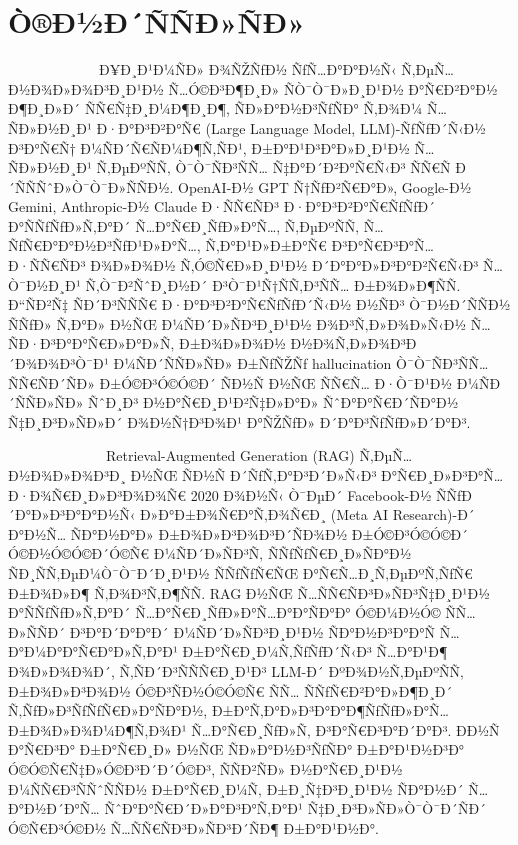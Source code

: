 \documentclass[12pt,A4]{report}
\begin{document}
\chapter{Ò®Ð½Ð´ÑÑÐ»ÑÐ»}
\ \ \ \ \ \ \ \ \  \ \ \ \ Ð¥Ð¸Ð¹Ð¼ÑÐ» Ð¾ÑŽÑƒÐ½ ÑƒÑ…Ð°Ð°Ð½Ñ‹ Ñ‚ÐµÑ…Ð½Ð¾Ð»Ð¾Ð³Ð¸Ð¹Ð½ Ñ…Ó©Ð³Ð¶Ð¸Ð» ÑÒ¯Ò¯Ð»Ð¸Ð¹Ð½
Ð°Ñ€Ð²Ð°Ð½ Ð¶Ð¸Ð»Ð´ ÑÑ€Ñ‡Ð¸Ð¼Ð¶Ð¸Ð¶, ÑÐ»Ð°Ð½Ð³ÑƒÑÐ° Ñ‚Ð¾Ð¼ Ñ…ÑÐ»Ð½Ð¸Ð¹ Ð·Ð°Ð³Ð²Ð°Ñ€ (Large Language Model,
LLM)-ÑƒÑƒÐ´Ñ‹Ð½ Ð³Ð°Ñ€Ñ† Ð¼ÑÐ´Ñ€ÑÐ¼Ð¶Ñ‚ÑÐ¹, Ð±Ð°Ð¹Ð³Ð°Ð»Ð¸Ð¹Ð½ Ñ…ÑÐ»Ð½Ð¸Ð¹ Ñ‚ÐµÐºÑÑ‚ Ò¯Ò¯ÑÐ³ÑÑ… Ñ‡Ð°Ð´Ð²Ð°Ñ€Ñ‹Ð³ ÑÑ€Ñ
Ð´ÑÑÑˆÐ»Ò¯Ò¯Ð»ÑÑÐ½. OpenAI-Ð½ GPT Ñ†ÑƒÐ²Ñ€Ð°Ð», Google-Ð½ Gemini, Anthropic-Ð½ Claude Ð·ÑÑ€ÑÐ³
Ð·Ð°Ð³Ð²Ð°Ñ€ÑƒÑƒÐ´ Ð°ÑÑƒÑƒÐ»Ñ‚Ð°Ð´ Ñ…Ð°Ñ€Ð¸ÑƒÐ»Ð°Ñ…, Ñ‚ÐµÐºÑÑ‚ Ñ…ÑƒÑ€Ð°Ð°Ð½Ð³ÑƒÐ¹Ð»Ð°Ñ…, Ñ‚Ð°Ð¹Ð»Ð±Ð°Ñ€ Ð³Ð°Ñ€Ð³Ð°Ñ… Ð·ÑÑ€ÑÐ³
Ð¾Ð»Ð¾Ð½ Ñ‚Ó©Ñ€Ð»Ð¸Ð¹Ð½ Ð´Ð°Ð°Ð»Ð³Ð°Ð²Ñ€Ñ‹Ð³ Ñ…Ò¯Ð½Ð¸Ð¹ Ñ‚Ò¯Ð²ÑˆÐ¸Ð½Ð´ Ð³Ò¯Ð¹Ñ†ÑÑ‚Ð³ÑÑ… Ð±Ð¾Ð»Ð¶ÑÑ. Ð“ÑÐ²Ñ‡ ÑÐ´Ð³ÑÑÑ€
Ð·Ð°Ð³Ð²Ð°Ñ€ÑƒÑƒÐ´Ñ‹Ð½ Ð½ÑÐ³ Ò¯Ð½Ð´ÑÑÐ½ ÑÑƒÐ» Ñ‚Ð°Ð» Ð½ÑŒ Ð¼ÑÐ´Ð»ÑÐ³Ð¸Ð¹Ð½ Ð¾Ð³Ñ‚Ð»Ð¾Ð»Ñ‹Ð½ Ñ…ÑÐ·Ð³Ð°Ð°Ñ€Ð»Ð°Ð»Ñ‚ Ð±Ð¾Ð»Ð¾Ð½
Ð½Ð¾Ñ‚Ð»Ð¾Ð³Ð´Ð¾Ð¾Ð³Ò¯Ð¹ Ð¼ÑÐ´ÑÑÐ»ÑÐ» Ð±ÑƒÑŽÑƒ hallucination Ò¯Ò¯ÑÐ³ÑÑ… ÑÑ€ÑÐ´ÑÐ» Ð±Ó©Ð³Ó©Ó©Ð´ ÑÐ½Ñ Ð½ÑŒ
ÑÑ€Ñ… Ð·Ò¯Ð¹Ð½ Ð¼ÑÐ´ÑÑÐ»ÑÐ» ÑˆÐ¸Ð³ Ð½Ð°Ñ€Ð¸Ð¹Ð²Ñ‡Ð»Ð°Ð» ÑˆÐ°Ð°Ñ€Ð´ÑÐ°Ð½ Ñ‡Ð¸Ð³Ð»ÑÐ»Ð´ Ð¾Ð½Ñ†Ð³Ð¾Ð¹ Ð°ÑŽÑƒÐ» Ð´Ð°Ð³ÑƒÑƒÐ»Ð´Ð°Ð³.

\
\ \ \ \ \ \ \ \ \  \ \ \ \ Retrieval-Augmented Generation (RAG) Ñ‚ÐµÑ…Ð½Ð¾Ð»Ð¾Ð³Ð¸ Ð½ÑŒ
ÑÐ½Ñ Ð´ÑƒÑ‚Ð°Ð³Ð´Ð»Ñ‹Ð³ Ð°Ñ€Ð¸Ð»Ð³Ð°Ñ… Ð·Ð¾Ñ€Ð¸Ð»Ð³Ð¾Ð¾Ñ€ 2020 Ð¾Ð½Ñ‹ Ò¯ÐµÐ´ Facebook-Ð½ ÑÑƒÐ´Ð°Ð»Ð³Ð°Ð°Ð½Ñ‹
Ð»Ð°Ð±Ð¾Ñ€Ð°Ñ‚Ð¾Ñ€Ð¸ (Meta AI Research)-Ð´ Ð°Ð½Ñ… ÑÐ°Ð½Ð°Ð» Ð±Ð¾Ð»Ð³Ð¾Ð³Ð´ÑÐ¾Ð½ Ð±Ó©Ð³Ó©Ó©Ð´ Ó©Ð½Ó©Ó©Ð´Ó©Ñ€
Ð¼ÑÐ´Ð»ÑÐ³Ñ‚ ÑÑƒÑƒÑ€Ð¸Ð»ÑÐ°Ð½ ÑÐ¸ÑÑ‚ÐµÐ¼Ò¯Ò¯Ð´Ð¸Ð¹Ð½ ÑÑƒÑƒÑ€ÑŒ Ð°Ñ€Ñ…Ð¸Ñ‚ÐµÐºÑ‚ÑƒÑ€ Ð±Ð¾Ð»Ð¶ Ñ‚Ð¾Ð³Ñ‚Ð¶ÑÑ. RAG Ð½ÑŒ
Ñ…ÑÑ€ÑÐ³Ð»ÑÐ³Ñ‡Ð¸Ð¹Ð½ Ð°ÑÑƒÑƒÐ»Ñ‚Ð°Ð´ Ñ…Ð°Ñ€Ð¸ÑƒÐ»Ð°Ñ…Ð°Ð°ÑÐ°Ð° Ó©Ð¼Ð½Ó© ÑÑ…Ð»ÑÑÐ´ Ð³Ð°Ð´Ð°Ð°Ð´ Ð¼ÑÐ´Ð»ÑÐ³Ð¸Ð¹Ð½
ÑÐ°Ð½Ð³Ð°Ð°Ñ Ñ…Ð°Ð¼Ð°Ð°Ñ€Ð°Ð»Ñ‚Ð°Ð¹ Ð±Ð°Ñ€Ð¸Ð¼Ñ‚ÑƒÑƒÐ´Ñ‹Ð³ Ñ…Ð°Ð¹Ð¶ Ð¾Ð»Ð¾Ð¾Ð´, Ñ‚ÑÐ´Ð³ÑÑÑ€Ð¸Ð¹Ð³ LLM-Ð´ ÐºÐ¾Ð½Ñ‚ÐµÐºÑÑ‚
Ð±Ð¾Ð»Ð³Ð¾Ð½ Ó©Ð³ÑÐ½Ó©Ó©Ñ€ ÑÑ… ÑÑƒÑ€Ð²Ð°Ð»Ð¶Ð¸Ð´ Ñ‚ÑƒÐ»Ð³ÑƒÑƒÑ€Ð»Ð°ÑÐ°Ð½, Ð±Ð°Ñ‚Ð°Ð»Ð³Ð°Ð°Ð¶ÑƒÑƒÐ»Ð°Ñ… Ð±Ð¾Ð»Ð¾Ð¼Ð¶Ñ‚Ð¾Ð¹
Ñ…Ð°Ñ€Ð¸ÑƒÐ»Ñ‚ Ð³Ð°Ñ€Ð³Ð°Ð´Ð°Ð³. Ð­Ð½Ñ Ð°Ñ€Ð³Ð° Ð±Ð°Ñ€Ð¸Ð» Ð½ÑŒ ÑÐ»Ð°Ð½Ð³ÑƒÑÐ° Ð±Ð°Ð¹Ð½Ð³Ð° Ó©Ó©Ñ€Ñ‡Ð»Ó©Ð³Ð´Ð´Ó©Ð³, ÑÑÐ²ÑÐ»
Ð½Ð°Ñ€Ð¸Ð¹Ð½ Ð¼ÑÑ€Ð³ÑÑˆÑÑÐ½ Ð±Ð°Ñ€Ð¸Ð¼Ñ‚ Ð±Ð¸Ñ‡Ð³Ð¸Ð¹Ð½ ÑÐ°Ð½Ð´ Ñ…Ð°Ð½Ð´Ð°Ñ… ÑˆÐ°Ð°Ñ€Ð´Ð»Ð°Ð³Ð°Ñ‚Ð°Ð¹ Ñ‡Ð¸Ð³Ð»ÑÐ»Ò¯Ò¯Ð´ÑÐ´
Ó©Ñ€Ð³Ó©Ð½ Ñ…ÑÑ€ÑÐ³Ð»ÑÐ³Ð´ÑÐ¶ Ð±Ð°Ð¹Ð½Ð°.
\end{document}
